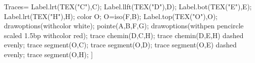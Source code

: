 \begin{exercice*}
\begin{enumerate}
\begin{minipage}{0.45\linewidth}
{                    Traces={%
                    Label.lrt(TEX("C"),C);
                    Label.llft(TEX("D"),D);
                    Label.bot(TEX("E"),E);
                    Label.lrt(TEX("H"),H);
                    color O;
                    O=iso(F,B);
                    Label.top(TEX("O"),O);
                    drawoptions(withcolor white);
                    pointe(A,B,F,G);
                    drawoptions(withpen pencircle scaled 1.5bp withcolor red);                
                    trace chemin(D,C,H);
                    trace chemin(D,E,H) dashed evenly;
                    trace segment(O,C);
                    trace segment(O,D);
                    trace segment(O,E) dashed evenly;
                    trace segment(O,H);
                    }
                ]
            }
        \end{minipage}
    \end{enumerate}
    \vfill
\end{exercice*}
